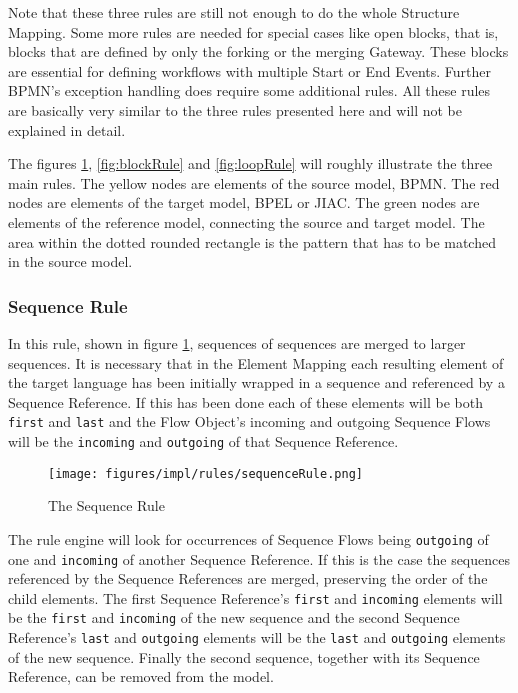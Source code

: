Note that these three rules are still not enough to do the whole Structure Mapping. Some more rules are needed for special cases like open blocks, that is, blocks that are defined by only the forking or the merging Gateway. These blocks are essential for defining workflows with multiple Start or End Events. Further BPMN's exception handling does require some additional rules. All these rules are basically very similar to the three rules presented here and will not be explained in detail.

The figures \ref{fig:seqRule}, \ref{fig:blockRule} and \ref{fig:loopRule} will roughly illustrate the three main rules. The yellow nodes are elements of the source model, BPMN. The red nodes are elements of the target model, BPEL or JIAC. The green nodes are elements of the reference model, connecting the source and target model. The area within the dotted rounded rectangle is the pattern that has to be matched in the source model.

\subsubsection*{Sequence Rule}
In this rule, shown in figure \ref{fig:seqRule}, sequences of sequences are merged to larger sequences. It is necessary that in the Element Mapping each resulting element of the target language has been initially wrapped in a sequence and referenced by a Sequence Reference. If this has been done each of these elements will be both \verb|first| and \verb|last| and the Flow Object's incoming and outgoing Sequence Flows will be the \verb|incoming| and \verb|outgoing| of that Sequence Reference.

\begin{figure}[ht]
	\centering
	\texttt{[image: figures/impl/rules/sequenceRule.png]}
	\caption[Sequence Rule]{The Sequence Rule}
	\label{fig:seqRule}
\end{figure}

The rule engine will look for occurrences of Sequence Flows being \verb|outgoing| of one and \verb|incoming| of another Sequence Reference. If this is the case the sequences referenced by the Sequence References are merged, preserving the order of the child elements. The first Sequence Reference's \verb|first| and \verb|incoming| elements will be the \verb|first| and \verb|incoming| of the new sequence and the second Sequence Reference's \verb|last| and \verb|outgoing| elements will be the \verb|last| and \verb|outgoing| elements of the new sequence. Finally the second sequence, together with its Sequence Reference, can be removed from the model.

